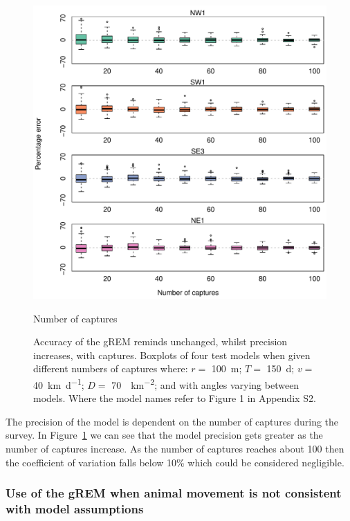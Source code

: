 \documentclass[a4paper,10pt,reqno,oneside]{amsart}
\begin{document}
\begin{figure}[t]
       \centering
	\includegraphics[width=1\textwidth]{imgs/ResultsNoCaptures.pdf}
         \caption{Number of captures}
           \label{f:Captures}
        \caption{Accuracy of the gREM reminds unchanged, whilst precision increases, with captures. Boxplots of four test models when given different numbers of captures where: $r = $ \SI{100}{\meter}; $T = $ \SI{150}{\day}; $v = $ \SI{40}{\kilo\meter\per\day}; $D = $ \SI{70}{\animals\per\kilo\meter\squared}; and with angles varying between models. Where the model names refer to Figure 1 in Appendix S2.} 
\end{figure}

The precision of the model is dependent on the number of captures during the survey. In Figure~\ref{f:Captures} we can see that the model precision gets greater as the number of captures increase. As the number of captures reaches about 100 then the coefficient of variation falls below 10\% which could be considered negligible. %

\subsubsection{Use of the gREM when animal movement is not consistent with model assumptions}
\end{document}
